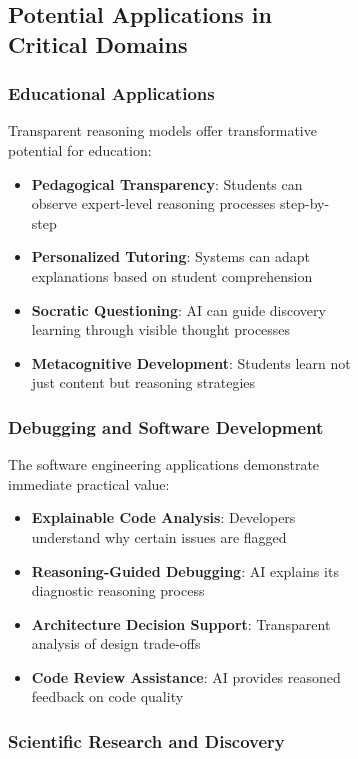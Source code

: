 \begin{figure}[H]
\begin{table}[H]
\begin{figure}[H]
\begin{table}[H]
\subsection{Potential Applications in Critical Domains}

\subsubsection{Educational Applications}

Transparent reasoning models offer transformative potential for education:

\begin{itemize}
    \item \textbf{Pedagogical Transparency}: Students can observe expert-level reasoning processes step-by-step
    \item \textbf{Personalized Tutoring}: Systems can adapt explanations based on student comprehension
    \item \textbf{Socratic Questioning}: AI can guide discovery learning through visible thought processes
    \item \textbf{Metacognitive Development}: Students learn not just content but reasoning strategies
\end{itemize}

\subsubsection{Debugging and Software Development}

The software engineering applications demonstrate immediate practical value:

\begin{itemize}
    \item \textbf{Explainable Code Analysis}: Developers understand why certain issues are flagged
    \item \textbf{Reasoning-Guided Debugging}: AI explains its diagnostic reasoning process
    \item \textbf{Architecture Decision Support}: Transparent analysis of design trade-offs
    \item \textbf{Code Review Assistance}: AI provides reasoned feedback on code quality
\end{itemize}

\subsubsection{Scientific Research and Discovery}


\end{table}
\end{figure}
\end{table}
\end{figure}
